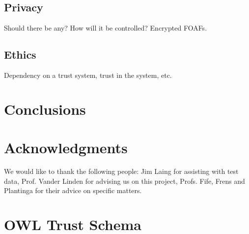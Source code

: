 \documentclass[onecolumn]{acm_proc_article-sp}
\begin{document}
\subsection{Privacy}
Should there be any?  How will it be controlled?
Encrypted FOAFs.

\subsection{Ethics}
Dependency on a trust system, trust in the system, etc.

\section{Conclusions}


\section{Acknowledgments}
We would like to thank the following people:  Jim Laing for assisting with test data, Prof. Vander Linden for advising us on this project, Profs. Fife, Frens and Plantinga for their advice on specific matters.

%
%


  

%
%

\onecolumn

\appendix

\section{OWL Trust Schema}
\label{schemaCode}
\end{document}
